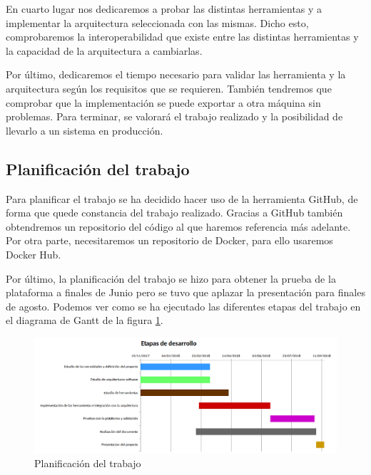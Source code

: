 En cuarto lugar nos dedicaremos a probar las distintas herramientas y a implementar la arquitectura seleccionada con las mismas. Dicho esto, comprobaremos la interoperabilidad que existe entre las distintas herramientas y la capacidad de la arquitectura a cambiarlas.\par


Por último, dedicaremos el tiempo necesario para validar las herramienta y la arquitectura según los requisitos que se requieren. También tendremos que comprobar que la implementación se puede exportar a otra máquina sin problemas. Para terminar, se valorará el trabajo realizado y la posibilidad de llevarlo a un sistema en producción.\par

\subsection{Planificación del trabajo\label{planificacion}}

Para planificar el trabajo se ha decidido hacer uso de la herramienta GitHub, de forma que quede constancia del trabajo realizado. Gracias a GitHub también obtendremos un repositorio del código al que haremos referencia más adelante. Por otra parte, necesitaremos un repositorio de Docker, para ello usaremos Docker Hub.\par
Por último, la planificación del trabajo se hizo para obtener la prueba de la plataforma a finales de Junio pero se tuvo que aplazar la presentación para finales de agosto. Podemos ver como se ha ejecutado las diferentes etapas del trabajo en el diagrama de Gantt de la figura \ref{etapas}.

\begin{figure}[htp]
\centering
\includegraphics[scale=0.57]{Imagenes/Etapasv2.png}
\caption{Planificación del trabajo}
\label{etapas}
\end{figure}



